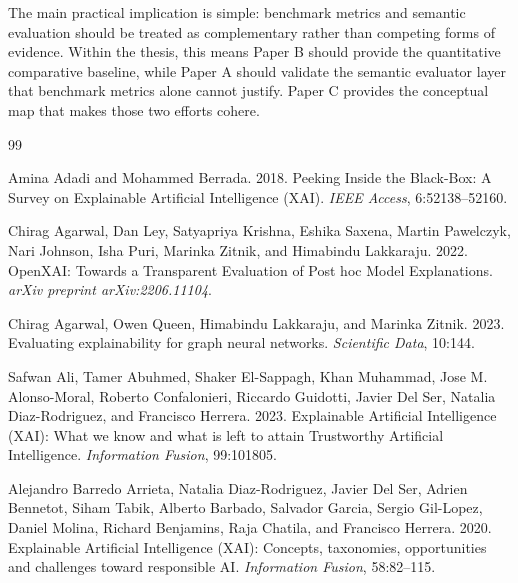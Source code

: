 \documentclass[twoside,11pt]{article}
\begin{document}
The main practical implication is simple: benchmark metrics and semantic
evaluation should be treated as complementary rather than competing
forms of evidence. Within the thesis, this means Paper B should provide
the quantitative comparative baseline, while Paper A should validate the
semantic evaluator layer that benchmark metrics alone cannot justify.
Paper C provides the conceptual map that makes those two efforts
cohere.


\clearpage
{}
{}
\begin{thebibliography}{99}

Amina Adadi and Mohammed Berrada.
2018.
Peeking Inside the Black-Box: A Survey on Explainable Artificial Intelligence (XAI).
\emph{IEEE Access}, 6:52138--52160.

Chirag Agarwal, Dan Ley, Satyapriya Krishna, Eshika Saxena, Martin Pawelczyk,
Nari Johnson, Isha Puri, Marinka Zitnik, and Himabindu Lakkaraju.
2022.
OpenXAI: Towards a Transparent Evaluation of Post hoc Model Explanations.
\emph{arXiv preprint arXiv:2206.11104}.

Chirag Agarwal, Owen Queen, Himabindu Lakkaraju, and Marinka Zitnik.
2023.
Evaluating explainability for graph neural networks.
\emph{Scientific Data}, 10:144.

Safwan Ali, Tamer Abuhmed, Shaker El-Sappagh, Khan Muhammad, Jose M. Alonso-Moral,
Roberto Confalonieri, Riccardo Guidotti, Javier Del Ser, Natalia Diaz-Rodriguez,
and Francisco Herrera.
2023.
Explainable Artificial Intelligence (XAI): What we know and what is left to attain Trustworthy Artificial Intelligence.
\emph{Information Fusion}, 99:101805.

Alejandro Barredo Arrieta, Natalia Diaz-Rodriguez, Javier Del Ser,
Adrien Bennetot, Siham Tabik, Alberto Barbado, Salvador Garcia,
Sergio Gil-Lopez, Daniel Molina, Richard Benjamins, Raja Chatila,
and Francisco Herrera.
2020.
Explainable Artificial Intelligence (XAI): Concepts, taxonomies, opportunities and challenges toward responsible AI.
\emph{Information Fusion}, 58:82--115.


\end{thebibliography}
\end{document}
